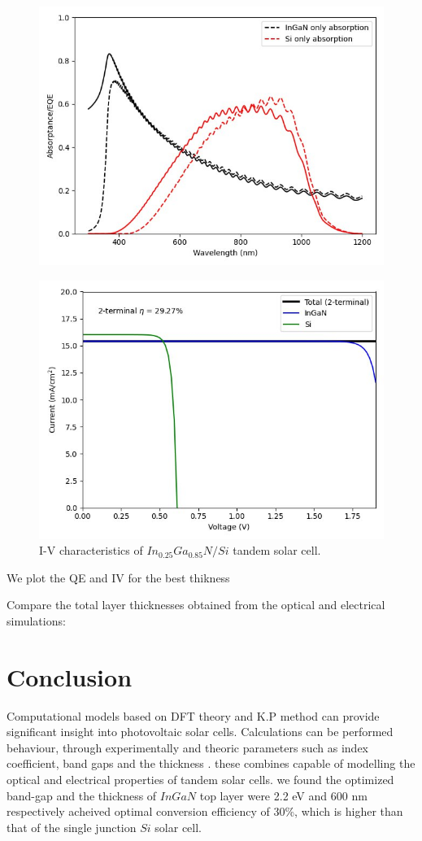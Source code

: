 \documentclass[preprint,12pt]{elsarticle}
\begin{document}
\begin{figure}[h!]
	\centering
	\includegraphics[width=0.7\linewidth, height=0.25\textheight]{Figure/Asorption_QE}
	\caption{}
	\label{fig:asorptionqe}
\end{figure}

\begin{figure}[h!]
	\centering
	\includegraphics[width=0.7\linewidth, height=0.25\textheight]{Figure/IV}
	\caption{I-V characteristics of $In_{0.25}Ga_{0.85}N/Si$  tandem solar cell.}
	\label{fig:iv}
\end{figure}


We plot the QE and IV for the best thikness

Compare the total layer thicknesses obtained from the optical and electrical simulations:

\section{Conclusion} \label{sec:Conclusion}
Computational models based on DFT theory and K.P method can provide significant insight into photovoltaic solar cells. Calculations can be performed behaviour, through experimentally and theoric parameters such as index coefficient, band gaps and the thickness . these combines capable of modelling the optical and electrical properties of tandem solar cells. we found the optimized band-gap and the thickness of $InGaN$ top layer were 2.2 eV and 600 nm respectively acheived optimal conversion efficiency of 30\%, which is higher than that of the single junction $Si$ solar cell. 
\end{document}
